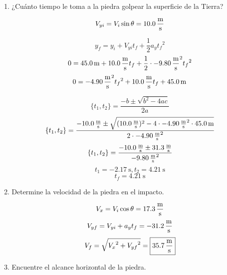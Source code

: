 \documentclass[Física - Práctica.root.tex]{subfiles}
\begin{document}
\begin{enumerate}
        \begin{center}
        \end{center}

        \begin{enumerate}
          \item ¿Cuánto tiempo le toma a la piedra golpear la superficie de la Tierra?

                \[V_{yi}=V_i\sin{\theta}=\SI{10,0}{\meter\over\second}\]

                \[y_f=y_i+V_{yi}t_f+\frac{1}{2}a_y{t_f}^2\]
                \[0=\SI{45,0}{\meter}+\SI{10,0}{\meter\over\second}t_f+\frac{1}{2}\cdot\SI{-9,80}{\meter\over\second\squared}{t_f}^2\]
                \[0=\SI{-4,90}{\meter\over\second\squared}{t_f}^2+\SI{10,0}{\meter\over\second}t_f+\SI{45,0}{\meter}\]

                \[\{t_1,t_2\}=\frac{-b\pm\sqrt{b^2-4ac}}{2a}\]
                \[\{t_1,t_2\}=\frac{\SI{-10,0}{\meter\over\second}\pm\sqrt{(\SI{10,0}{\meter\over\second})^2-4\cdot\SI{-4,90}{\meter\over\second\squared}\cdot\SI{45,0}{\meter}}}{2\cdot\SI{-4,90}{\meter\over\second\squared}}\]
                \[\{t_1,t_2\}=\frac{\SI{-10,0}{\meter\over\second}\pm\SI{31,3}{\meter\over\second}}{\SI{-9,80}{\meter\over\second\squared}}\]
                \[t_1=\SI{-2,17}{\second}, t_2=\SI{4,21}{\second}\]
                \[t_f=\boxed{\SI{4,21}{\second}}\]

          \item Determine la velocidad de la piedra en el impacto.

                \[V_x=V_i\cos{\theta}=\SI{17,3}{\meter\over\second}\]
                \[V_{yf}=V_{yi}+a_yt_f=\SI{-31,2}{\meter\over\second}\]
                \[V_f=\sqrt{{V_x}^2+{V_{yf}}^2}=\boxed{\SI{35,7}{\meter\over\second}}\]

          \item Encuentre el alcance horizontal de la piedra.


\end{enumerate}
\end{enumerate}
\end{document}
